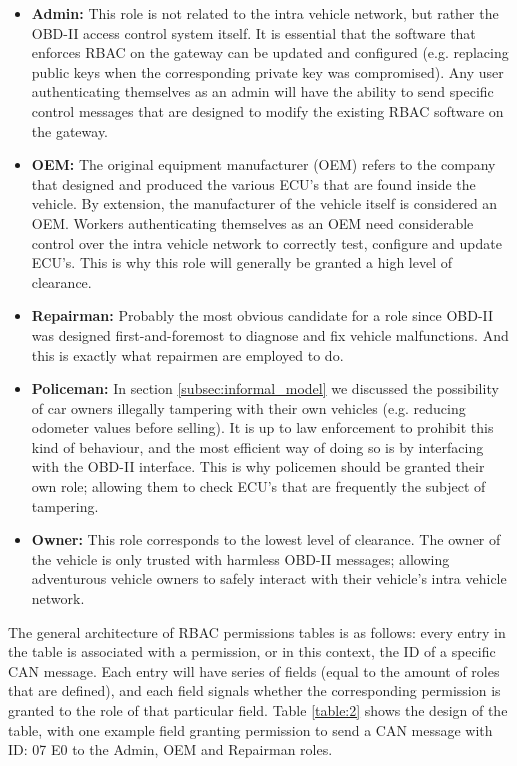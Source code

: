 \begin{itemize}
	\item \textbf{Admin:} This role is not related to the intra vehicle network, but rather the OBD-II access control system itself. It is essential that the software that enforces RBAC on the gateway can be updated and configured (e.g. replacing public keys when the corresponding private key was compromised). Any user authenticating themselves as an admin will have the ability to send specific control messages that are designed to modify the existing RBAC software on the gateway.
	
	\item \textbf{OEM:} The original equipment manufacturer (OEM) refers to the company that designed and produced the various ECU's that are found inside the vehicle. By extension, the manufacturer of the vehicle itself is considered an OEM. Workers authenticating themselves as an OEM need considerable control over the intra vehicle network to correctly test, configure and update ECU's. This is why this role will generally be granted a high level of clearance.
	
	\item \textbf{Repairman:} Probably the most obvious candidate for a role since OBD-II was designed first-and-foremost to diagnose and fix vehicle malfunctions. And this is exactly what repairmen are employed to do.
	
	\item \textbf{Policeman:} In section \ref{subsec:informal_model} we discussed the possibility of car owners illegally tampering with their own vehicles (e.g. reducing odometer values before selling). It is up to law enforcement to prohibit this kind of behaviour, and the most efficient way of doing so is by interfacing with the OBD-II interface. This is why policemen should be granted their own role; allowing them to check ECU's that are frequently the subject of tampering.
	
	\item \textbf{Owner:} This role corresponds to the lowest level of clearance. The owner of the vehicle is only trusted with harmless OBD-II messages; allowing adventurous vehicle owners to safely interact with their vehicle's intra vehicle network.
\end{itemize}
The general architecture of RBAC permissions tables is as follows: every entry in the table is associated with a permission, or in this context, the ID of a specific CAN message. Each entry will have series of fields (equal to the amount of roles that are defined), and each field signals whether the corresponding permission is granted to the role of that particular field. Table \ref{table:2} shows the design of the table, with one example field granting permission to send a CAN message with ID: 07 E0 to the Admin, OEM and Repairman roles.

